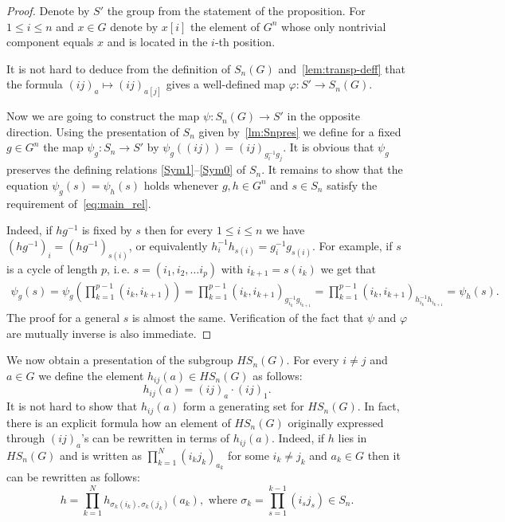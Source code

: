 \documentclass[oneside, 12pt]{amsart}
\theoremstyle{plain}
\numberwithin{equation}{section}
\numberwithin{lemma}{section}
\theoremstyle{remark}
\theoremstyle{definition}
\begin{document}
\begin{proof}
Denote by $S'$ the group from the statement of the proposition.
For $1\leq i\leq n$ and $x\in G$ denote by $x[i]$ the element of $G^n$ 
 whose only nontrivial component equals $x$ and is located in the $i$-th position.

It is not hard to deduce from the definition of $S_n(G)$ and~\cref{lem:transp-deff} 
 that the formula $(ij)_a \mapsto (ij)_{a[j]}$ gives a well-defined map $\varphi\colon S'\to S_n(G)$.

Now we are going to construct the map $\psi\colon S_n(G)\to S'$ in the opposite direction. 
Using the presentation of $S_n$ given by~\cref{lm:Snpres}  we define for a fixed $g\in G^n$ the map 
 $\psi_g\colon S_n \to S'$ by $\psi_g((ij)) = (ij)_{g_i^{-1} g_j}.$
It is obvious that $\psi_g$ preserves the defining relations \eqref{Sym1}--\eqref{Sym0} of $S_n$. 
It remains to show that the equation $\psi_g(s) = \psi_h(s)$ holds whenever $g, h\in G^n$ and $s\in S_n$ satisfy the requirement of~\eqref{eq:main_rel}.

Indeed, if $hg^{-1}$ is fixed by $s$ then for every $1\leq i\leq n$ we have $(hg^{-1})_i = (hg^{-1})_{s(i)}$, or equivalently
$h_i^{-1} h_{s(i)} = g_i^{-1} g_{s(i)}$. %
For example, if $s$ is a cycle of length $p$, i.\,e. $s=(i_1, i_2, \ldots i_p)$ with $i_{k+1} = s(i_k)$ we get that
\begin{multline} \nonumber
 \psi_g(s) = \psi_g\left({\prod\limits_{k=1}^{p-1}(i_k, i_{k+1})}\right) = 
 \prod\limits_{k=1}^{p-1}\left(i_k, i_{k+1}\right)_{g_{i_k}^{-1} g_{i_{k+1}}} = 
 \prod\limits_{k=1}^{p-1}\left(i_k, i_{k+1}\right)_{h_{i_k}^{-1} h_{i_{k+1}}} = \psi_h(s).
\end{multline}
The proof for a general $s$ is almost the same.
Verification of the fact that $\psi$ and $\varphi$ are mutually inverse is also immediate.
\end{proof}

We now obtain a presentation of the subgroup $HS_n(G)$.
For every $i\neq j$ and $a\in G$ we define the element $h_{ij}(a) \in HS_n(G)$ as follows:
\begin{equation} \label{eq:h-def} 
h_{ij}(a) = (ij)_{a} \cdot (ij)_1. 
\end{equation}
It is not hard to show that $h_{ij}(a)$ form a generating set for $HS_n(G)$.
In fact, there is an explicit formula how an element of $HS_n(G)$ originally expressed through $(ij)_{a}$'s can be rewritten in terms of $h_{ij}(a)$.
Indeed, if $h$ lies in $HS_n(G)$ and is written as $\prod_{k=1}^N(i_k j_k)_{a_k}$ for some $i_k\neq j_k$ and $a_k\in G$ then it can be rewritten as follows:
\begin{equation} \label{eq:rp} \tag{$\tau$}
 h = \prod_{k=1}^N h_{\sigma_k(i_k), \sigma_k(j_k)}(a_k),\text{ where } \sigma_k=\prod_{s=1}^{k-1} (i_s j_s) \in S_n. \end{equation}
\end{document}
